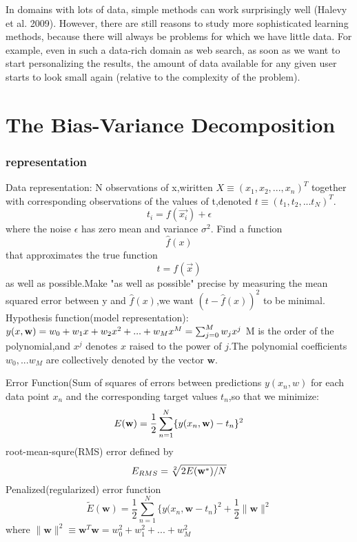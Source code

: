 In domains with lots of data, simple methods can work surprisingly well (Halevy et al. 2009). However, there are still reasons to study more sophisticated learning methods, because there will always be problems for which we have little data. For example, even in such a data-rich domain as web search, as soon as we want to start personalizing the results, the amount of data available for any given user starts to look small again (relative to the complexity of the problem).

\section{The Bias-Variance Decomposition}
\subsubsection{representation}
Data representation:
N observations of x,wiritten 
$X \equiv (x_1,x_2,...,x_n)^T$
together with corresponding observations of the values of t,denoted 
$t \equiv (t_1,t_2,...t_N)^T$.
\begin{equation}
t_i = f(\vec{x_i}) + \epsilon 
\end{equation}
where the noise $ \epsilon $ has zero mean and variance $ \sigma^2 $.
Find a function \[ \hat{f}(x) \] that approximates the true function \[ t = f(\vec{x}) \] as well as possible.Make "as well as possible" precise  by measuring the mean squared error between y and $ \hat{f}(x) $,we want $ (t - \hat{f}(x))^2 $ to be minimal.
Hypothesis function(model representation):
$y(x,\bold w)= w_0+w_1x+w_2x^2+...+w_Mx^M = \sum_{j=0}^{M}w_jx^j$
M is the order of the polynomial,and $x^j$ denotes $x$ raised to the power of $j$.The polynomial coefficients $w_0,...w_M$ are
collectively denoted by the vector $\mathbf{w}$.

Error Function(Sum of squares of errors between predictions $y(x_n,w)$ for each data point $x_n$ and the corresponding target values $t_n$,so that we minimize:
\begin{equation}
E(\bold w)=\frac{1}{2}\sum_{n=1}^{N}\{y(x_n,\bold w)-t_n \}^2
\end{equation}
root-mean-squre(RMS) error defined by
\begin{equation} 
E_{RMS} = \sqrt[2]{2E(\bold w^*)/N}
\end{equation}
Penalized(regularized) error function
\begin{equation}
\widetilde{E}(\textbf{w}) = \frac{1}{2}\sum_{n=1}^{N}\{y(x_n,\textbf{w}-t_n\}^2 + \frac{1}{2} \parallel \textbf{w} \parallel^2
\end{equation}
where $\parallel \textbf{w} \parallel^2 \equiv \textbf{w}^T\textbf{w}=w_0^2+w_1^2+...+w_M^2$

